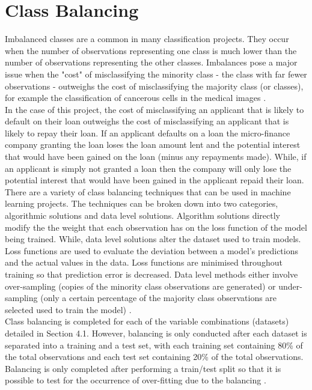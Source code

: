 \section{Class Balancing}

Imbalanced classes are a common in many classification projects. They occur when the number of observations representing one class is much lower than the number of observations representing the other classes. Imbalances pose a major issue when the "cost" of misclassifying the minority class - the class with far fewer observations - outweighs the cost of misclassifying the majority class (or classes), for example the classification of cancerous cells in the medical images \parencite{Balancing2}. \\

In the case of this project, the cost of misclassifying an applicant that is likely to default on their loan outweighs the cost of misclassifying an applicant that is likely to repay their loan. If an applicant defaults on a loan the micro-finance company granting the loan loses the loan amount lent and the potential interest that would have been gained on the loan (minus any repayments made). While, if an applicant is simply not granted a loan then the company will only lose the potential interest that would have been gained in the applicant repaid their loan.  \\

There are a variety of class balancing techniques that can be used in machine learning projects. The techniques can be broken down into two categories, algorithmic solutions and data level solutions. Algorithm solutions directly modify the the weight that each observation has on the loss function of the model being trained. While, data level solutions alter the dataset used to train models. Loss functions are used to evaluate the deviation between a model's predictions and the actual values in the data. Loss functions are minimised throughout training so that prediction error is decreased. Data level methods either involve over-sampling (copies of the minority class observations are generated) or under-sampling (only a certain percentage of the majority class observations are selected used to train the model) \parencite{Balancing1}. \\

Class balancing is completed for each of the variable combinations (datasets) detailed in Section 4.1. However, balancing is only conducted after each dataset is separated into a training and a test set, with each training set containing 80\% of the total observations and each test set containing 20\% of the total observations. Balancing is only completed after performing a train/test split so that it is possible to test for the occurrence of over-fitting due to the balancing \parencite{Balancing2}. \\

